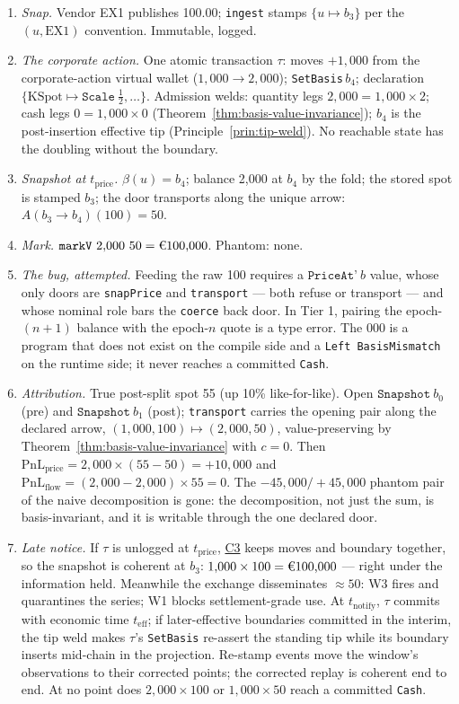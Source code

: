 \documentclass[11pt,a4paper]{article}
\newcommand{\EUR}[1]{\mbox{\texteuro#1}}
\begin{document}
\begin{enumerate}[nosep]
\item \emph{Snap.} Vendor EX1 publishes 100.00; \texttt{ingest} stamps
$\{u\mapsto b_3\}$ per the $(u,\mathrm{EX1})$ convention. Immutable, logged.
\item \emph{The corporate action.} One atomic transaction $\tau$: moves $+1{,}000$ from
the corporate-action virtual wallet ($1{,}000\to2{,}000$); \texttt{SetBasis}\,$b_4$;
declaration $\{\mathrm{KSpot}\mapsto\texttt{Scale}\ \tfrac12,\dots\}$. Admission welds:
quantity legs $2{,}000=1{,}000\times2$; cash legs $0=1{,}000\times0$
(Theorem~\ref{thm:basis-value-invariance}); $b_4$ is the post-insertion effective tip
(Principle~\ref{prin:tip-weld}). No reachable state has the doubling without the
boundary.
\item \emph{Snapshot at $t_{\mathrm{price}}$.} $\beta(u)=b_4$; balance 2{,}000 at $b_4$
by the fold; the stored spot is stamped $b_3$; the door transports along the unique
arrow: $A(b_3\to b_4)(100)=50$.
\item \emph{Mark.} $\texttt{markV}\ 2{,}000\ 50=\EUR{100{,}000}$. Phantom: none.
\item \emph{The bug, attempted.} Feeding the raw 100 requires a
$\texttt{PriceAt'}\ b$ value, whose only doors are \texttt{snapPrice} and \texttt{transport}
--- both refuse or transport --- and whose nominal role bars the \texttt{coerce} back
door. In Tier 1, pairing the epoch-$(n{+}1)$ balance with the epoch-$n$ quote is a type
error. The \EUR{200{,}000} is a program that does not exist on the compile side and a
\texttt{Left BasisMismatch} on the runtime side; it never reaches a committed
\texttt{Cash}.
\item \emph{Attribution.} True post-split spot 55 (up 10\% like-for-like). Open
$\texttt{Snapshot}\ b_0$ (pre) and $\texttt{Snapshot}\ b_1$ (post); \texttt{transport}
carries the opening pair along the declared arrow, $(1{,}000,100)\mapsto(2{,}000,50)$,
value-preserving by Theorem~\ref{thm:basis-value-invariance} with $c=0$. Then
$\mathrm{PnL}_{\text{price}}=2{,}000\times(55-50)=+10{,}000$ and
$\mathrm{PnL}_{\text{flow}}=(2{,}000-2{,}000)\times55=0$. The $-45{,}000/+45{,}000$
phantom pair of the naive decomposition is gone: the decomposition, not just the sum, is
basis-invariant, and it is writable through the one declared door.
\item \emph{Late notice.} If $\tau$ is unlogged at $t_{\mathrm{price}}$,
\hyperref[cond:C3]{C3} keeps moves and boundary together, so the snapshot is coherent at
$b_3$: $1{,}000\times100=\EUR{100{,}000}$ --- right under the information held.
Meanwhile the exchange disseminates $\approx50$: W3 fires and quarantines the series; W1
blocks settlement-grade use. At $t_{\mathrm{notify}}$, $\tau$ commits with economic time
$t_{\mathrm{eff}}$; if later-effective boundaries committed in the interim, the tip weld
makes $\tau$'s \texttt{SetBasis} re-assert the standing tip while its boundary inserts
mid-chain in the projection. Re-stamp events move the window's observations to their
corrected points; the corrected replay is coherent end to end. At no point does
$2{,}000\times100$ or $1{,}000\times50$ reach a committed \texttt{Cash}.
\end{enumerate}
\end{document}
